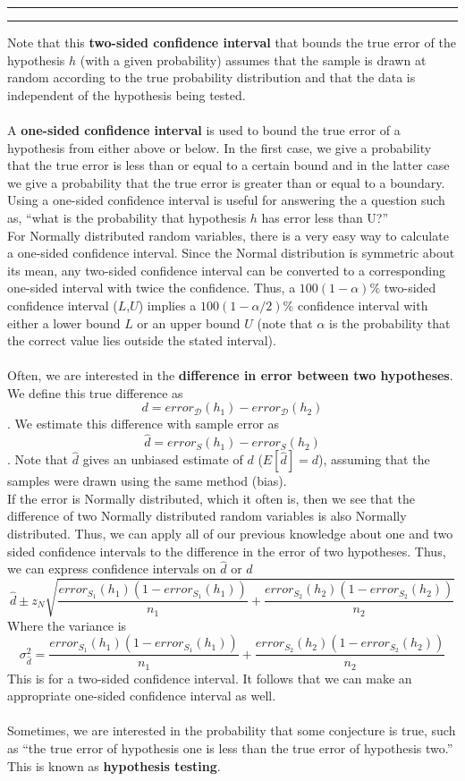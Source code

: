 \documentclass[11pt]{article}
\newcounter{questionCounter}
\newcounter{partCounter}[questionCounter]
\newenvironment{question}[2][\arabic{questionCounter}]{%
    \addtocounter{questionCounter}{1}%
    \setcounter{partCounter}{0}%
    \vspace{.25in} \hrule \vspace{0.5em}%
        \noindent{\bf #1: #2}%
    \vspace{0.8em} \hrule \vspace{.10in}%
}{}
\begin{document}
\begin{question}{Evaluating and Comparing Hypotheses}
	Note that this \textbf{two-sided confidence interval} that bounds the true error of the hypothesis $h$ (with a given probability) assumes that the sample is drawn at random according to the true probability distribution and that the data is independent of the hypothesis being tested.
	\\
	\\
	A \textbf{one-sided confidence interval} is used to bound the true error of a hypothesis from either above or below. In the first case, we give a probability that the true error is less than or equal to a certain bound and in the latter case we give a probability that the true error is greater than or equal to a boundary. Using a one-sided confidence interval is useful for answering the a question such as, ``what is the probability that hypothesis $h$ has error less than U?''
	\\
	For Normally distributed random variables, there is a very easy way to calculate a one-sided confidence interval. Since the Normal distribution is symmetric about its mean, any two-sided confidence interval can be converted to a corresponding one-sided interval with twice the confidence. Thus, a $100(1-\alpha)\%$ two-sided confidence interval ($L$,$U$) implies a $100(1-\alpha/2)\%$ confidence interval with either a lower bound $L$ or an upper bound $U$ (note that $\alpha$ is the probability that the correct value lies outside the stated interval).
	\\
	\\
	Often, we are interested in the \textbf{difference in error between two hypotheses}. We define this true difference as $$d = error_{\mathcal{D}}(h_1) - error_{\mathcal{D}}(h_2)$$. We estimate this difference with sample error as $$\hat d = error_S(h_1) - error_S(h_2)$$. Note that $\hat d$ gives an unbiased estimate of $d$ ($E[\hat d] = d$), assuming that the samples were drawn using the same method (bias).
	\\
	If the error is Normally distributed, which it often is, then we see that the difference of two Normally distributed random variables is also Normally distributed. Thus, we can apply all of our previous knowledge about one and two sided confidence intervals to the difference in the error of two hypotheses. Thus, we can express confidence intervals on $\hat d$ or $d$
	$$\hat d \pm z_N \sqrt{\frac{error_{S_1}(h_1)(1-error_{S_1}(h_1))}{n_1} + \frac{error_{S_2}(h_2)(1-error_{S_2}(h_2))}{n_2}}$$
	Where the variance is
	$$\sigma_{\hat d}^2 = \frac{error_{S_1}(h_1)(1-error_{S_1}(h_1))}{n_1} + \frac{error_{S_2}(h_2)(1-error_{S_2}(h_2))}{n_2}$$
	This is for a two-sided confidence interval. It follows that we can make an appropriate one-sided confidence interval as well.
	\\
	\\
	Sometimes, we are interested in the probability that some conjecture is true, such as ``the true error of hypothesis one is less than the true error of hypothesis two.'' This is known as \textbf{hypothesis testing}. 
	

\end{question}
\end{document}
